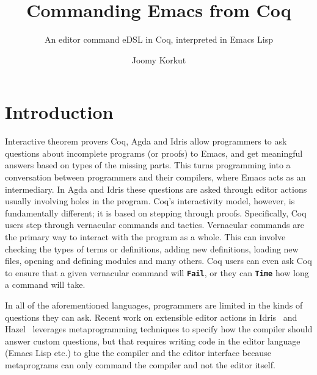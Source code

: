 \documentclass[acmlarge]{acmart}
\newcommand{\IdrisKeyword}[1]{{\textbf{#1}}}
\newcommand{\kw}[1]{\IdrisKeyword{\texttt{#1}}}
\begin{document}
\title{Commanding Emacs from Coq}
\subtitle{An editor command eDSL in Coq, interpreted in Emacs Lisp}

\author{Joomy Korkut}

\renewcommand{\shortauthors}{Joomy Korkut}


\fancyfoot{}
\maketitle
\thispagestyle{empty}
\pagestyle{empty}


\vspace{-1em}
\section{Introduction}

  Interactive theorem provers Coq, Agda and Idris allow programmers to
  ask questions about incomplete programs (or proofs) to Emacs, and get
  meaningful answers based on types of the missing parts.
  This turns programming into a conversation between
  programmers and their compilers, where Emacs acts as an intermediary.
  In Agda and Idris these questions are asked through editor actions usually
  involving holes in the program. Coq's interactivity model, however, is
  fundamentally different; it is based on stepping through proofs.
  Specifically, Coq users step through vernacular commands and tactics.
  Vernacular commands are the primary way to interact with the program as a whole.
  This can involve checking the types of terms or definitions, adding new
  definitions, loading new files, opening and defining modules and many others.
  Coq users can even ask Coq to ensure that a given vernacular command will
  \kw{Fail}, or they can \kw{Time} how long a command will take.

  In all of the aforementioned languages, programmers are limited in the kinds
  of questions they can ask.
  Recent work on extensible editor actions in Idris~\cite{extensible} and
  Hazel~\cite{DBLP:conf/snapl/OmarVHSGAH17,rayObt} leverages
  metaprogramming techniques to specify how the compiler should answer
  custom questions, but that requires writing code in the editor language
  (Emacs Lisp etc.) to glue the compiler and the editor interface because
  metaprograms can only command the compiler and not the editor itself.
\end{document}
